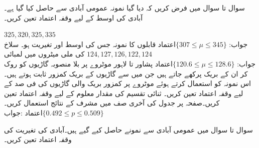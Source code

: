 سوال  تا سوال  میں فرض کریں کہ دیا گیا نمونہ  عمومی آبادی سے حاصل کیا گیا ہے۔آبادی کی اوسط  کے لیے  وقفہ اعتماد تعین کریں۔

 \quad
$325,320,325,335$\\
جواب:\quad
$\text{اعتماد} \{307\le \mu\le 345\}$
\quad
{} قابلوں کا نمونہ جس کی اوسط  اور تغیریت  ہو۔
\quad
سلاخ کی ملی میٹروں میں لمبائی
$124, 127,126,122,124$\\
جواب:\quad
$\text{اعتماد} \{120.6\le \mu\le 128.6\}$
\quad
پشاور تا لاہور موٹروے پر بلا منصوبہ  گاڑیوں کو روک کر ان کے بریک پرکھے جاتے ہیں جن میں سے  گاڑیوں کے بریک کمزور ثابت ہوتے ہیں۔اس نمونہ کو استعمال کرتے ہوئے موٹروے پر کمزور بریک والی گاڑیوں کی فی صد  کے لیے  وقفہ اعتماد تعین کریں۔
\quad
ثنائی تقسیم کی مقدار معلوم  کے لیے  وقفہ اعتماد تعین کریں۔صفحہ  پر جدول  کی آخری صف میں  مشرف کے نتائج استعمال کریں۔\\
جواب:\quad
$\text{اعتماد}  \{ 0.492\le p \le 0.509\}$

سوال  تا سوال  میں عمومی آبادی سے نمونے حاصل کیے گیے ہیں۔آبادی کی تغیریت  کی  وقفہ اعتماد تعین کریں۔

